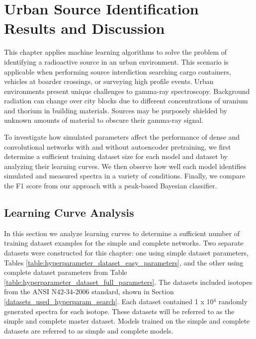 \chapter{Urban Source Identification Results and Discussion}


This chapter applies machine learning algorithms to solve the problem of identifying a radioactive source in an urban environment. This scenario is applicable when performing source interdiction searching cargo containers, vehicles at boarder crossings, or surveying high profile events. Urban environments present unique challenges to gamma-ray spectroscopy. Background radiation can change over city blocks due to different concentrations of uranium and thorium in building materials. Sources may be purposely shielded by unknown amounts of material to obscure their gamma-ray signal. 

To investigate how simulated parameters affect the performance of dense and convolutional networks with and without autoencoder pretraining, we first determine a sufficient training dataset size for each model and dataset by analyzing their learning curves. We then observe how well each model identifies simulated and measured spectra in a variety of conditions. Finally, we compare the F1 score from our approach with a peak-based Bayesian classifier.

\section{Learning Curve Analysis} \label{sectionlearningcurve}

In this section we analyze learning curves to determine a sufficient number of training dataset examples for the simple and complete networks. Two separate datasets were constructed for this chapter: one using simple dataset parameters, Tables \ref{table:hyperparameter_dataset_easy_parameters}, and the other using complete dataset parameters from Table \ref{table:hyperparameter_dataset_full_parameters}. The datasets included isotopes from the ANSI N42-34-2006 standard, shown in Section \ref{datasets_used_hyperparam_search}. Each dataset contained 1 x 10$^{4}$ randomly generated spectra for each isotope. These datasets will be referred to as the simple and complete master dataset. Models trained on the simple and complete datasets are referred to as simple and complete models.

